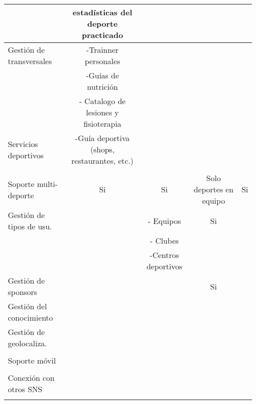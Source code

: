 \begin{landscape}
\begin{table}
\begin{center}
{\begin{tabular}{|p{5cm}|llll|}
     & \multicolumn{1}{c}{ estadísticas del deporte practicado} & \multicolumn{1}{c}{} & \multicolumn{1}{c}{} & \multicolumn{1}{c|}{} \\ 
    \hline
    Gestión de transversales & \multicolumn{1}{c}{-Trainner personales} & \multicolumn{1}{c}{} & \multicolumn{1}{c}{} & \multicolumn{1}{c|}{} \\ 
     & \multicolumn{1}{c}{-Guías de nutrición} & \multicolumn{1}{c}{} & \multicolumn{1}{c}{} & \multicolumn{1}{c|}{} \\ 
     & \multicolumn{1}{c}{- Catalogo de lesiones y fisioterapia} & \multicolumn{1}{c}{} & \multicolumn{1}{c}{} & \multicolumn{1}{c|}{} \\ 
    \hline
    Servicios deportivos & \multicolumn{1}{c}{-Guía deportiva (shops, restaurantes, etc.)} & \multicolumn{1}{c}{} & \multicolumn{1}{c}{} & \multicolumn{1}{c|}{} \\ 
     & \multicolumn{1}{c}{} & \multicolumn{1}{c}{} & \multicolumn{1}{c}{} & \multicolumn{1}{c|}{} \\ 
    \hline
    Soporte multi-deporte & \multicolumn{1}{c}{Si} & \multicolumn{1}{c}{Si} & \multicolumn{1}{c}{Solo deportes en equipo} & \multicolumn{1}{c|}{Si} \\ 
    \hline
    Gestión de tipos de usu. & \multicolumn{1}{c}{} & \multicolumn{1}{c}{- Equipos } & \multicolumn{1}{c}{Si} & \multicolumn{1}{c|}{} \\ 
     & \multicolumn{1}{c}{} & \multicolumn{1}{c}{- Clubes} & \multicolumn{1}{c}{} & \multicolumn{1}{c|}{} \\ 
     & \multicolumn{1}{c}{} & \multicolumn{1}{c}{-Centros deportivos} & \multicolumn{1}{c}{} & \multicolumn{1}{c|}{} \\ 
    \hline
    Gestión de sponsors & \multicolumn{1}{c}{} & \multicolumn{1}{c}{} & \multicolumn{1}{c}{Si} & \multicolumn{1}{c|}{} \\ 
    \hline
    Gestión del conocimiento & \multicolumn{1}{c}{} & \multicolumn{1}{c}{} & \multicolumn{1}{c}{} & \multicolumn{1}{c|}{} \\ 
    \hline
    Gestión de geolocaliza. & \multicolumn{1}{c}{} & \multicolumn{1}{c}{} & \multicolumn{1}{c}{} & \multicolumn{1}{c|}{} \\ 
     & \multicolumn{1}{c}{} & \multicolumn{1}{c}{} & \multicolumn{1}{c}{} & \multicolumn{1}{c|}{} \\ 
    \hline
    Soporte móvil & \multicolumn{1}{c}{} & \multicolumn{1}{c}{} & \multicolumn{1}{c}{} & \multicolumn{1}{c|}{} \\ 
     & \multicolumn{1}{c}{} & \multicolumn{1}{c}{} & \multicolumn{1}{c}{} & \multicolumn{1}{c|}{} \\ 
    \hline
    Conexión con otros SNS & \multicolumn{1}{c}{} & \multicolumn{1}{c}{} & \multicolumn{1}{c}{} & \multicolumn{1}{c|}{} \\ 
     & \multicolumn{1}{c}{} & \multicolumn{1}{c}{} & \multicolumn{1}{c}{} & \multicolumn{1}{c|}{} \\ 
    \hline
  \end{tabular}
  }
    \end{center}
\end{table}
  

\end{landscape}
